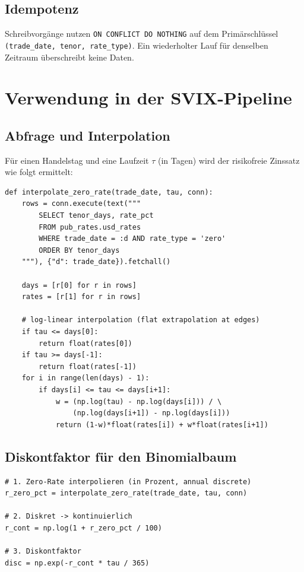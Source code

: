 \documentclass[11pt, a4paper]{article}
\begin{document}
\subsection{Idempotenz}

Schreibvorgänge nutzen \texttt{ON CONFLICT DO NOTHING} auf dem
Primärschlüssel \texttt{(trade\_date, tenor, rate\_type)}. Ein
wiederholter Lauf für denselben Zeitraum überschreibt keine Daten.

\section{Verwendung in der SVIX-Pipeline}

\subsection{Abfrage und Interpolation}

Für einen Handelstag und eine Laufzeit $\tau$ (in Tagen) wird der
risikofreie Zinssatz wie folgt ermittelt:

\begin{lstlisting}
def interpolate_zero_rate(trade_date, tau, conn):
    rows = conn.execute(text("""
        SELECT tenor_days, rate_pct
        FROM pub_rates.usd_rates
        WHERE trade_date = :d AND rate_type = 'zero'
        ORDER BY tenor_days
    """), {"d": trade_date}).fetchall()

    days = [r[0] for r in rows]
    rates = [r[1] for r in rows]

    # log-linear interpolation (flat extrapolation at edges)
    if tau <= days[0]:
        return float(rates[0])
    if tau >= days[-1]:
        return float(rates[-1])
    for i in range(len(days) - 1):
        if days[i] <= tau <= days[i+1]:
            w = (np.log(tau) - np.log(days[i])) / \
                (np.log(days[i+1]) - np.log(days[i]))
            return (1-w)*float(rates[i]) + w*float(rates[i+1])
\end{lstlisting}

\subsection{Diskontfaktor für den Binomialbaum}

\begin{lstlisting}
# 1. Zero-Rate interpolieren (in Prozent, annual discrete)
r_zero_pct = interpolate_zero_rate(trade_date, tau, conn)

# 2. Diskret -> kontinuierlich
r_cont = np.log(1 + r_zero_pct / 100)

# 3. Diskontfaktor
disc = np.exp(-r_cont * tau / 365)
\end{lstlisting}
\end{document}
